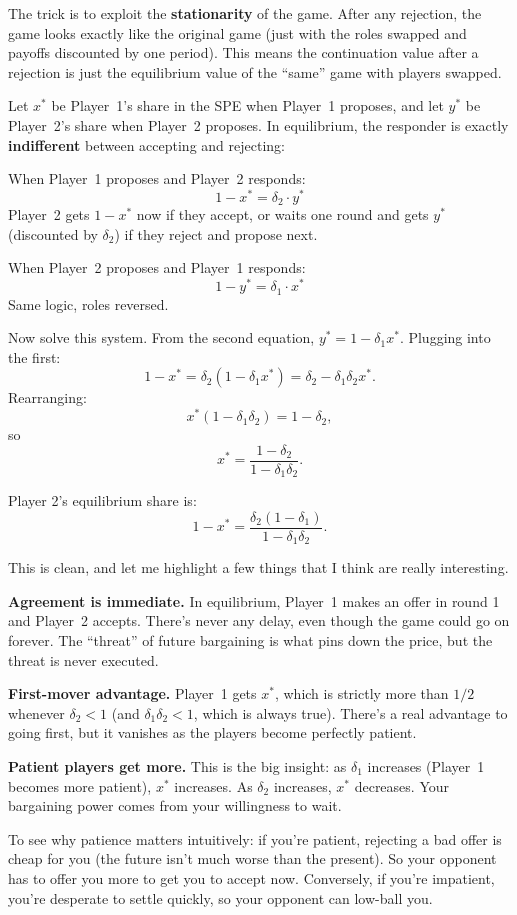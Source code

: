 \documentclass[11pt]{article}
\begin{document}
The trick is to exploit the \textbf{stationarity} of the game. After any rejection, the game looks exactly like the original game (just with the roles swapped and payoffs discounted by one period). This means the continuation value after a rejection is just the equilibrium value of the ``same'' game with players swapped.

Let $x^*$ be Player~1's share in the SPE when Player~1 proposes, and let $y^*$ be Player~2's share when Player~2 proposes. In equilibrium, the responder is exactly \textbf{indifferent} between accepting and rejecting:

When Player~1 proposes and Player~2 responds:
\[
1 - x^* = \delta_2 \cdot y^*
\]
Player~2 gets $1 - x^*$ now if they accept, or waits one round and gets $y^*$ (discounted by $\delta_2$) if they reject and propose next.

When Player~2 proposes and Player~1 responds:
\[
1 - y^* = \delta_1 \cdot x^*
\]
Same logic, roles reversed.

Now solve this system. From the second equation, $y^* = 1 - \delta_1 x^*$. Plugging into the first:
\[
1 - x^* = \delta_2(1 - \delta_1 x^*) = \delta_2 - \delta_1 \delta_2 x^*.
\]
Rearranging:
\[
x^*(1 - \delta_1 \delta_2) = 1 - \delta_2,
\]
so
\[
\boxed{x^* = \frac{1 - \delta_2}{1 - \delta_1 \delta_2}}.
\]

Player 2's equilibrium share is:
\[
1 - x^* = \frac{\delta_2(1 - \delta_1)}{1 - \delta_1 \delta_2}.
\]

This is clean, and let me highlight a few things that I think are really interesting.

\textbf{Agreement is immediate.} In equilibrium, Player~1 makes an offer in round 1 and Player~2 accepts. There's never any delay, even though the game could go on forever. The ``threat'' of future bargaining is what pins down the price, but the threat is never executed.

\textbf{First-mover advantage.} Player~1 gets $x^*$, which is strictly more than $1/2$ whenever $\delta_2 < 1$ (and $\delta_1 \delta_2 < 1$, which is always true). There's a real advantage to going first, but it vanishes as the players become perfectly patient.

\textbf{Patient players get more.} This is the big insight: as $\delta_1$ increases (Player~1 becomes more patient), $x^*$ increases. As $\delta_2$ increases, $x^*$ decreases. Your bargaining power comes from your willingness to wait.

To see why patience matters intuitively: if you're patient, rejecting a bad offer is cheap for you (the future isn't much worse than the present). So your opponent has to offer you more to get you to accept now. Conversely, if you're impatient, you're desperate to settle quickly, so your opponent can low-ball you.
\end{document}
